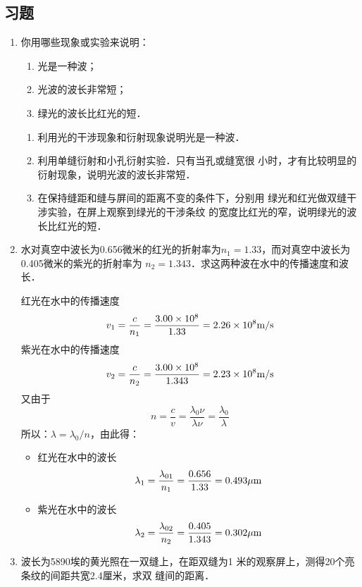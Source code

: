 \subsection{习题}

\begin{enumerate}
    \item 你用哪些现象或实验来说明：
    \begin{enumerate}
        \item 光是一种波；
        \item 光波的波长非常短；
        \item 绿光的波长比红光的短．
    \end{enumerate}


    \begin{solution}
\begin{enumerate}
    \item 利用光的干涉现象和衍射现象说明光是一种波．
    \item 利用单缝衍射和小孔衍射实验．只有当孔或缝宽很
    小时，才有比较明显的衍射现象，说明光波的波长非常短．
    \item 在保持缝距和缝与屏间的距离不变的条件下，分别用
    绿光和红光做双缝干涉实验，在屏上观察到绿光的干涉条纹
    的宽度比红光的窄，说明绿光的波长比红光的短．
\end{enumerate} 
    \end{solution}
    
    \item 水对真空中波长为0.656微米的红光的折射率为$n_1
    =1.33$，而对真空中波长为0.405微米的紫光的折射率为
    $n_2=1.343$．求这两种波在水中的传播速度和波长．


    \begin{solution}
红光在水中的传播速度
\[v_1=\frac{c}{n_1}=\frac{3.00\times10^8}{1.33}=2.26\times10^8\text{m}/\text{s}\]
紫光在水中的传播速度
\[v_2=\frac{c}{n_2}=\frac{3.00\times10^8}{1.343}=2.23\times10^8\text{m}/\text{s}\]
又由于
\[n=\frac{c}{v}=\frac{\lambda_0 \nu}{\lambda\nu}=\frac{\lambda_0}{\lambda}\]
所以：$\lambda=\lambda_0/n$，由此得：
\begin{itemize}
    \item 红光在水中的波长
\[\lambda_1=\frac{\lambda_{01}}{n_1}=\frac{0.656}{1.33}=0.493\mu{\rm m}\]
    \item     紫光在水中的波长
\[\lambda_2=\frac{\lambda_{02}}{n_2}=\frac{0.405}{1.343}=0.302\mu{\rm m}\]
\end{itemize}

    \end{solution}
    
    \item 波长为5890埃的黄光照在一双缝上，在距双缝为1
    米的观察屏上，测得20个亮条纹的间距共宽2.4厘米，求双
    缝间的距离．



\end{enumerate}
